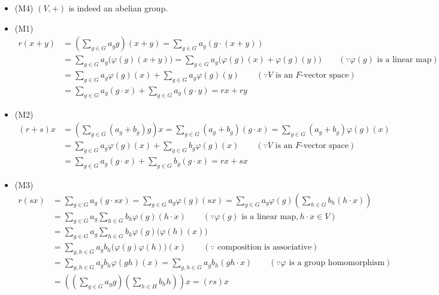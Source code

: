 \begin{itemize}
	\item {\sffamily (M4)} $(V, +)$ is indeed an abelian group.
	\item {\sffamily (M1)}
	$$\begin{aligned}
	r(x+y) &= \left(\sum_{g\in G} a_gg\right)(x+y) = \sum_{g\in G}a_g (g\cdot (x+y)) \\
		&=\sum_{g\in G} a_g \big(\varphi(g)(x+y)\big) = \sum_{g\in G} a_g \big(\varphi(g)(x) + \varphi(g)(y)\big) \qquad (\because \varphi(g) \text{ is a linear map})\\
		&=\sum_{g\in G} a_g \varphi(g)(x) + \sum_{g\in G} a_g\varphi(g)(y) \qquad (\because V \text{ is an } F\text{-vector space})\\
		&=\sum_{g\in G}a_g (g\cdot x) + \sum_{g\in G}a_g (g\cdot y) = rx + ry
	\end{aligned}$$
	\item {\sffamily (M2)}
	$$\begin{aligned}
	(r+s)x &= \left(\sum_{g\in G} (a_g +b_g) g\right)x = \sum_{g\in G}(a_g+b_g)(g\cdot x)=\sum_{g\in G} (a_g+b_g) \varphi(g)(x) \\
		&= \sum_{g\in G} a_g \varphi(g)(x) + \sum_{g\in G} b_g \varphi(g)(x) \qquad (\because V \text{ is an } F\text{-vector space})\\
		&=\sum_{g\in G} a_g (g\cdot x) + \sum_{g\in G}b_g (g\cdot x) = rx + sx
	\end{aligned}$$
	\item {\sffamily (M3)}
	$$\begin{aligned}
	r(sx) &= \sum_{g\in G} a_g (g\cdot sx) = \sum_{g\in G} a_g \varphi(g)(sx) = \sum_{g\in G}a_g \varphi(g)\left(\sum_{h\in G} b_h (h\cdot x)\right)\\
		&=\sum_{g\in G}a_g \sum_{h\in G} b_h \varphi(g)\left(h\cdot x\right) \qquad (\because \varphi(g) \text{ is a linear map}, h\cdot x \in V)\\
		&=\sum_{g\in G}a_g \sum_{h\in G} b_h \varphi(g)\big(\varphi(h)(x)\big) \\
		&=\sum_{g, h \in G}a_gb_h \big(\varphi(g)\varphi(h)\big)(x) \qquad (\because \text{ composition is associative})\\
		&=\sum_{g, h\in G} a_gb_h \varphi(gh)(x) = \sum_{g, h\in G} a_gb_h (gh\cdot x) \qquad (\because \varphi \text{ is a group homomorphism})\\
		&= \left(\left(\sum_{g\in G} a_g g\right)\left(\sum_{h\in H} b_h h\right)\right)x = (rs)x
	\end{aligned}$$
\end{itemize}
